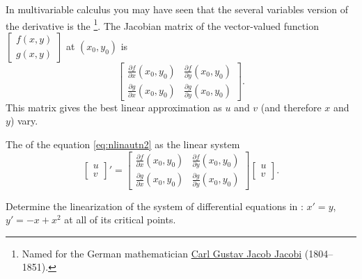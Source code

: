 \documentclass{ximera}
\begin{document}
In multivariable calculus you may have seen that the several variables version of the derivative is the \emph{}%
\footnote{
    Named for the German mathematician \href{https://en.wikipedia.org/wiki/Carl_Gustav_Jacob_Jacobi}{Carl Gustav Jacob Jacobi} (1804--1851).
    }.   
The Jacobian matrix of the vector-valued function
$\left[ \begin{smallmatrix} f(x,y) \\ g(x,y) \end{smallmatrix} \right]$
at $(x_0,y_0)$ is 
\begin{equation*}
    \begin{bmatrix}
        \frac{\partial f}{\partial x}(x_0,y_0) & \frac{\partial f}{\partial y}(x_0,y_0) \\
        \frac{\partial g}{\partial x}(x_0,y_0) & \frac{\partial g}{\partial y}(x_0,y_0)
    \end{bmatrix} .
\end{equation*}
This matrix gives the best linear approximation as $u$ and $v$ (and therefore $x$ and $y$) vary.  

\begin{definition}
    The \emph{} of the equation \eqref{eq:nlinautn2} as the linear system
    \begin{equation*}
        \begin{bmatrix} 
            u \\ 
            v 
        \end{bmatrix} ' =
        \begin{bmatrix}
            \frac{\partial f}{\partial x}(x_0,y_0) & \frac{\partial f}{\partial y}(x_0,y_0) \\
            \frac{\partial g}{\partial x}(x_0,y_0) & \frac{\partial g}{\partial y}(x_0,y_0)
        \end{bmatrix} 
        \begin{bmatrix} 
            u \\ 
            v 
        \end{bmatrix} .
    \end{equation*}
\end{definition}

\begin{example} \label{example:nlin-1b-examplelin}
    Determine the linearization of the system of differential equations in : $x' = y$, $y' = -x+x^2$ at all of its critical points.
\end{example}
\end{document}
